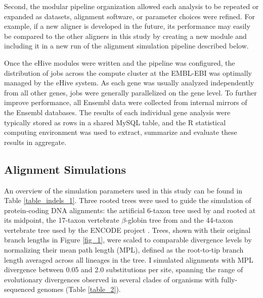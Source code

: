 Second, the modular pipeline organization allowed each analysis to be
repeated or expanded as datasets, alignment software, or parameter
choices were refined. For example, if a new aligner is developed in
the future, its performance may easily be compared to the other
aligners in this study by creating a new module and including it in a
new run of the alignment simulation pipeline described below.

Once the eHive modules were written and the pipeline was configured,
the distribution of jobs across the compute cluster at the EMBL-EBI
was optimally managed by the eHive system. As each gene was usually
analyzed independently from all other genes, jobs were generally
parallelized on the gene level. To further improve performance, all
Ensembl data were collected from internal mirrors of the Ensembl
databases. The results of each individual gene analysis were typically
stored as rows in a shared MySQL table, and the R statistical
computing environment was used to extract, summarize and evaluate
these results in aggregate.


\subsection{Alignment Simulations}

An overview of the simulation parameters used in this study can be
found in Table \ref{table_indels_1}. Three rooted trees were used to
guide the simulation of protein-coding DNA alignments: the artificial
6-taxon tree used by \citet{Anisimova2001} and
\citet{Massingham2005} rooted at its midpoint, the 17-taxon
vertebrate $\beta$-globin tree from \citet{Yang2000CodonSubstitution}
and the 44-taxon vertebrate tree used by the ENCODE project
\citep{Birney2007,Nikolaev2007}. Trees, shown with their original
branch lengths in Figure \ref{fig_1}, were scaled to comparable
divergence levels by normalizing their mean path length (MPL), defined
as the root-to-tip branch length averaged across all lineages in the
tree. I simulated alignments with MPL divergence between 0.05 and 2.0
\syn substitutions per \syn site, spanning the range of evolutionary
divergences observed in several clades of organisms with
fully-sequenced genomes (Table \ref{table_2}).

